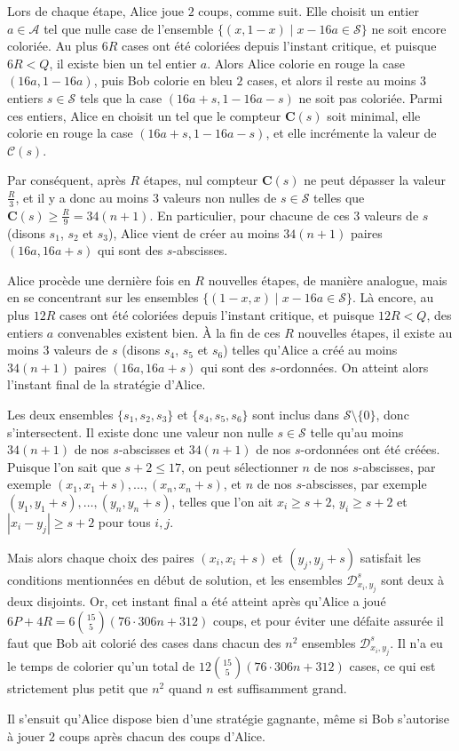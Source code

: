 \begin{sol}[105]
Lors de chaque étape, Alice joue $2$ coups, comme suit.
Elle choisit un entier $a \in \mathcal{A}$ tel que nulle case de l'ensemble $\{(x,1-x) \mid x - 16 a \in \mathcal{S}\}$ ne soit encore coloriée.
Au plus $6 R$ cases ont été coloriées depuis l'instant critique, et puisque $6 R < Q$, il existe bien un tel entier $a$.
Alors Alice colorie en rouge la case $(16a,1-16a)$, puis Bob colorie en bleu $2$ cases, et alors il reste au moins $3$ entiers $s \in \mathcal{S}$
tels que la case $(16a+s,1-16a-s)$ ne soit pas coloriée. Parmi ces entiers, Alice en choisit un tel que le compteur $\mathbf{C}(s)$ soit minimal,
elle colorie en rouge la case $(16a+s,1-16a-s)$, et elle incrémente la valeur de $\mathcal{C}(s)$.

Par conséquent, après $R$ étapes, nul compteur $\mathbf{C}(s)$ ne peut dépasser la valeur $\frac{R}{3}$,
et il y a donc au moins $3$ valeurs non nulles de $s \in \mathcal{S}$ telles que $\mathbf{C}(s) \geq \frac{R}{9} = 34 (n+1)$.
En particulier, pour chacune de ces $3$ valeurs de $s$ (disons $s_1$, $s_2$ et $s_3$),
Alice vient de créer au moins $34 (n+1)$ paires $(16a,16a+s)$ qui sont des $s$-abscisses.

Alice procède une dernière fois en $R$ nouvelles étapes, de manière analogue,
mais en se concentrant sur les ensembles $\{(1-x,x) \mid x - 16 a \in \mathcal{S}\}$.
Là encore, au plus $12 R$ cases ont été coloriées depuis l'instant critique, et puisque $12 R < Q$, des entiers $a$ convenables existent bien.
À la fin de ces $R$ nouvelles étapes, il existe au moins $3$ valeurs de $s$ (disons $s_4$, $s_5$ et $s_6$) telles qu'Alice
a créé au moins $34 (n+1)$ paires $(16a,16a+s)$ qui sont des $s$-ordonnées.
On atteint alors l'instant \og{}final\fg{} de la stratégie d'Alice.

Les deux ensembles $\{s_1,s_2,s_3\}$ et $\{s_4,s_5,s_6\}$ sont inclus dans $\mathcal{S} \setminus \{0\}$, donc s'intersectent.
Il existe donc une valeur non nulle $s \in \mathcal{S}$ telle qu'au moins $34 (n+1)$ de nos $s$-abscisses et $34 (n+1)$ de nos $s$-ordonnées ont été créées.
Puisque l'on sait que $s+2 \leq 17$, on peut sélectionner $n$ de nos $s$-abscisses, par exemple $(x_1,x_1+s),\ldots,(x_n,x_n+s)$, et
$n$ de nos $s$-abscisses, par exemple $(y_1,y_1+s),\ldots,(y_n,y_n+s)$, telles que l'on ait $x_i \geq s+2$, $y_i \geq s+2$ et $|x_i-y_j| \geq s+2$ pour tous $i, j$.

Mais alors chaque choix des paires $(x_i,x_i+s)$ et $(y_j,y_j+s)$ satisfait les conditions mentionnées en début de solution,
et les ensembles $\mathcal{D}^s_{x_i,y_j}$ sont deux à deux disjoints.
Or, cet instant final a été atteint après qu'Alice a joué $6P + 4R = 6 \binom{15}{5} (76 \cdot 306 n + 312)$ coups,
et pour éviter une défaite assurée il faut que Bob ait colorié des cases dans chacun des $n^2$ ensembles $\mathcal{D}^s_{x_i,y_j}$.
Il n'a eu le temps de colorier qu'un total de $12 \binom{15}{5} (76 \cdot 306 n + 312)$ cases, ce qui est strictement plus petit que $n^2$ quand $n$ est
suffisamment grand.

Il s'ensuit qu'Alice dispose bien d'une stratégie gagnante, même si Bob s'autorise à jouer $2$ coups après chacun des coups d'Alice.
\end{sol}

